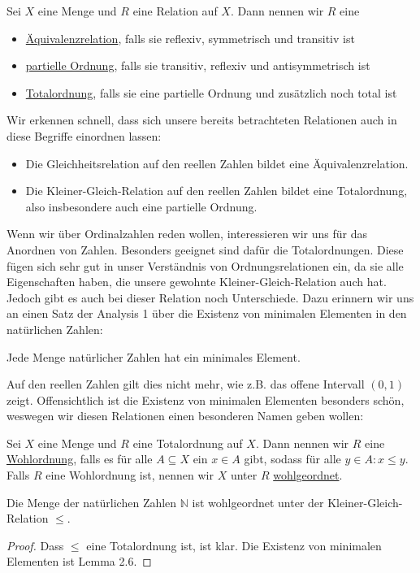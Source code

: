 \documentclass[11pt]{scrartcl}
\newcommand{\N}{\mathbb{N}}
\begin{document}
\begin{definition}
	Sei $X$ eine Menge und $R$ eine Relation auf $X$. Dann nennen wir $R$ eine 
	\begin{itemize}
		\item \underline{Äquivalenzrelation}, falls sie reflexiv, symmetrisch und transitiv ist
		\item \underline{partielle Ordnung}, falls sie transitiv, reflexiv und antisymmetrisch ist
		\item \underline{Totalordnung}, falls sie eine partielle Ordnung und zusätzlich noch total ist
	\end{itemize}
\end{definition}
\begin{example}
	Wir erkennen schnell, dass sich unsere bereits betrachteten Relationen auch in diese Begriffe einordnen lassen:	
	\begin{itemize}
		\item Die Gleichheitsrelation auf den reellen Zahlen bildet eine Äquivalenzrelation.
		\item Die Kleiner-Gleich-Relation auf den reellen Zahlen bildet eine Totalordnung, also insbesondere auch eine partielle Ordnung.
	\end{itemize}
\end{example}
Wenn wir über Ordinalzahlen reden wollen, interessieren wir uns für das Anordnen von Zahlen. Besonders geeignet sind dafür die Totalordnungen. Diese fügen sich sehr gut in unser Verständnis von Ordnungsrelationen ein, da sie alle Eigenschaften haben, die unsere gewohnte Kleiner-Gleich-Relation auch hat. \\
Jedoch gibt es auch bei dieser Relation noch Unterschiede. Dazu erinnern wir uns an einen Satz der Analysis 1 über die Existenz von minimalen Elementen in den natürlichen Zahlen:
\begin{lemma} Jede Menge natürlicher Zahlen hat ein minimales Element.
\end{lemma}
Auf den reellen Zahlen gilt dies nicht mehr, wie z.B. das offene Intervall $(0,1)$ zeigt. Offensichtlich ist die Existenz von minimalen Elementen besonders schön, weswegen wir diesen Relationen einen besonderen Namen geben wollen:
\begin{definition}
	Sei $X$ eine Menge und $R$ eine Totalordnung auf $X$. Dann nennen wir $R$ eine \underline{Wohlordnung}, falls es für alle $A\subseteq X$ ein $x\in A$ gibt, sodass für alle $y\in A: x\leq y$. Falls $R$ eine Wohlordnung ist, nennen wir $X$ unter $R$ \underline{wohlgeordnet}.
\end{definition}
\begin{theorem}
	Die Menge der natürlichen Zahlen $\N$ ist wohlgeordnet unter der Kleiner-Gleich-Relation $\leq$.
\end{theorem}
\begin{proof}
	Dass $\leq$ eine Totalordnung ist, ist klar. Die Existenz von minimalen Elementen ist Lemma 2.6.
\end{proof}
\end{document}
